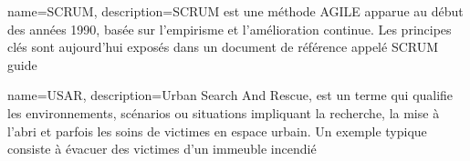 {
  name={SCRUM},
    description={SCRUM est une méthode AGILE apparue au début des années 1990, basée sur l'empirisme et l'amélioration continue. Les principes clés sont aujourd'hui exposés dans un document de référence appelé SCRUM guide}
}

{
  name={USAR},
    description={Urban Search And Rescue, est un terme qui qualifie les environnements, scénarios ou situations impliquant la recherche, la mise à l'abri et parfois les soins de victimes en espace urbain. 
    Un exemple typique consiste à évacuer des victimes d'un immeuble incendié}
}